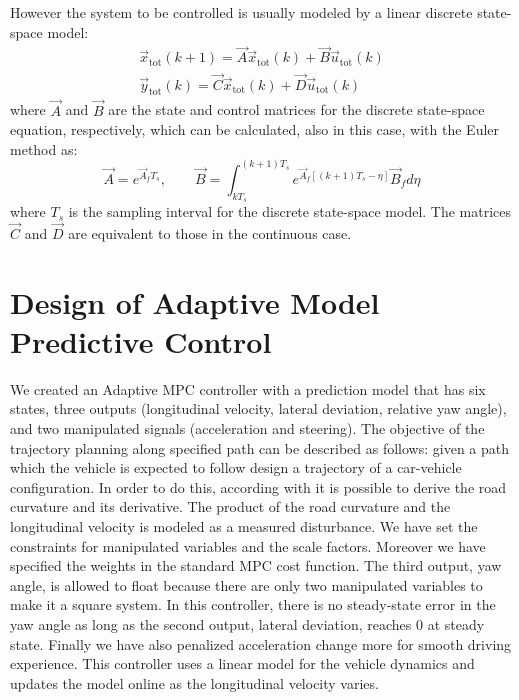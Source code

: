 However the system to be controlled is usually modeled by a linear discrete state-space model:
\begin{equation}
\label{eqn:full_dynamics_model_disc}
\begin{array}{rr}
{\vec{x}}_{\text{tot}}(k+1) =\vec{A} \vec{x}_{\text{tot}}(k)+ \vec{B} \vec{u}_{\text{tot}}(k)\\
\vec{y}_{\text{tot}}(k) = \vec{C}\vec{x}_{\text{tot}}(k) + \vec{D} \vec{u}_{\text{tot}}(k)
\end{array}
\end{equation}
where $\vec{A}$ and $\vec{B}$ are the state and control matrices for the discrete state-space equation, respectively, which can be calculated, also in this case, with the Euler method as:
\[
\vec{A} = e^{\vec{A}_fT_s},\qquad \vec{B} = \int_{kT_s}^{(k+1)T_s} e^{\vec{A}_f[(k+1)T_s-\eta]}\vec{B}_f d\eta
\]
where $T_s$ is the sampling interval for the discrete state-space model. The matrices $\vec{C}$ and $\vec{D}$ are equivalent to those in the continuous case.

\section{Design of Adaptive Model Predictive Control}
We created an Adaptive MPC controller with a prediction model that has six states, three outputs (longitudinal velocity, lateral deviation, relative yaw angle), and two manipulated signals (acceleration and steering). 
The objective of the trajectory planning along specified path can be described as follows: given a path which the vehicle is expected to follow design a trajectory of a car-vehicle configuration.
In order to do this, according with \cite{curvature} it is possible to derive the road curvature and its derivative.
The product of the road curvature and the longitudinal velocity is modeled as a measured disturbance. We have set the constraints for manipulated variables and the scale factors. Moreover we have specified the weights in the standard MPC cost function. The third output, yaw angle, is allowed to float because there are only two manipulated variables to make it a square system. In this controller, there is no steady-state error in the yaw angle as long as the second output, lateral deviation, reaches 0 at steady state. Finally we have also penalized acceleration change more for smooth driving experience. This controller uses a linear model for the vehicle dynamics and updates the model online as the longitudinal velocity varies.

